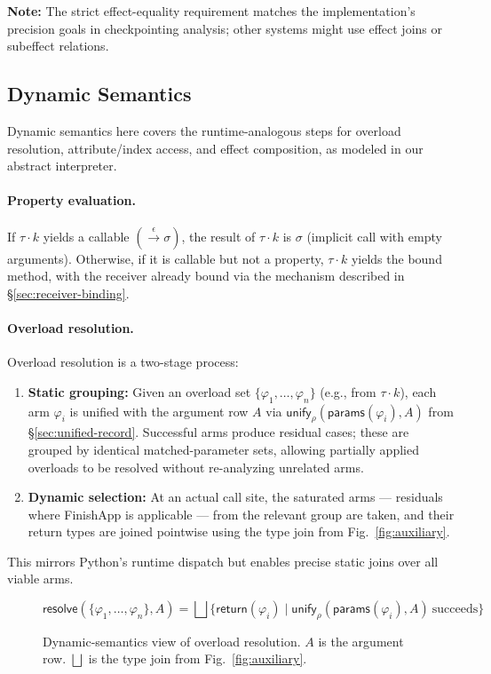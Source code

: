 \noindent\textbf{Note:} The strict effect-equality requirement matches the implementation’s precision goals in checkpointing analysis; other systems might use effect joins or subeffect relations.

\subsection{Dynamic Semantics}

Dynamic semantics here covers the runtime-analogous steps for overload resolution, attribute/index access, and effect composition, as modeled in our abstract interpreter.

\paragraph{Property evaluation.}
If $\tau \cdot k$ yields a callable $(\xrightarrow{\epsilon} \sigma)$, 
the result of $\tau \cdot k$ is $\sigma$ (implicit call with empty arguments).  
Otherwise, if it is callable but not a property, $\tau \cdot k$ yields the bound method, with the receiver already bound via the mechanism described in \S\ref{sec:receiver-binding}.

\paragraph{Overload resolution.}
\label{sec:overload-resolution}
Overload resolution is a two-stage process:
\begin{enumerate}
\item \textbf{Static grouping:}  
  Given an overload set $\{\varphi_1, \ldots, \varphi_n\}$ (e.g., from $\tau \cdot k$), each arm $\varphi_i$ is unified with the argument row $A$ via  
  $\mathsf{unify}_{\rho}(\mathsf{params}(\varphi_i), A)$ from \S\ref{sec:unified-record}.  
  Successful arms produce residual cases; these are grouped by identical matched-parameter sets, allowing partially applied overloads to be resolved without re-analyzing unrelated arms.
\item \textbf{Dynamic selection:}  
  At an actual call site, the saturated arms --- residuals where \textsf{FinishApp} is applicable --- from the relevant group are taken, and their return types are joined pointwise using the type join from Fig.~\ref{fig:auxiliary}.
\end{enumerate}
This mirrors Python’s runtime dispatch but enables precise static joins over all viable arms.

\begin{figure*}[t]
\centering
\[
\mathsf{resolve}(\{\varphi_1, \ldots, \varphi_n\}, A) =
\bigsqcup\{\mathsf{return}(\varphi_i) \mid \mathsf{unify}_{\rho}(\mathsf{params}(\varphi_i), A) \ \text{succeeds}\}
\]
\caption{Dynamic-semantics view of overload resolution. $A$ is the argument row. $\bigsqcup$ is the type join from Fig.~\ref{fig:auxiliary}.}
\label{fig:dynamic}
\end{figure*}

